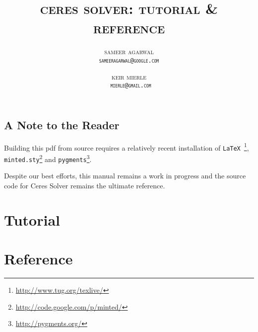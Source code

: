 \documentclass[11pt,letterpaper,oneside]{memoir}
\title{\Huge\scshape
\MakeLowercase{Ceres Solver:  Tutorial \& Reference}
}
\author{
\scshape\MakeLowercase{Sameer Agarwal} \\ \texttt{sameeragarwal@google.com} 
\and 
\scshape\MakeLowercase{Keir Mierle} \\  \texttt{ mierle@gmail.com}
}
\begin{document}
\maketitle
\thispagestyle{empty}
\newpage
\pagestyle{ceres}
\tableofcontents
\newpage

\chapter{A Note to the Reader}
Building this pdf from source requires a relatively recent installation of \texttt{LaTeX}~\footnote{\url{http://www.tug.org/texlive/}}, \texttt{minted.sty}\footnote{\url{http://code.google.com/p/minted/}} and \texttt{pygments}\footnote{\url{http://pygments.org/}}.

Despite our best efforts, this manual remains a work in progress and the source code for Ceres Solver remains the ultimate reference.





\part{Tutorial}
\label{part:tutorial}






\part{Reference}
\label{part:reference}








\end{document}

